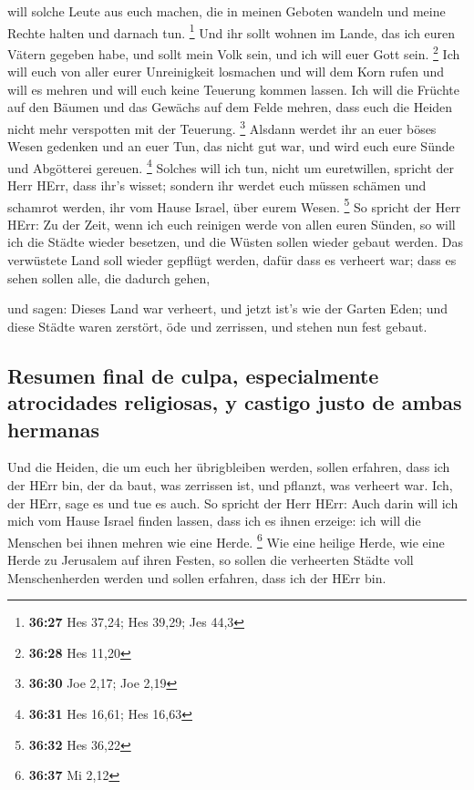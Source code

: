 will solche Leute aus euch machen, die in meinen Geboten wandeln und
meine Rechte halten und darnach tun. \footnote{\textbf{36:27} Hes 37,24;
  Hes 39,29; Jes 44,3}  Und ihr sollt wohnen im Lande,
das ich euren Vätern gegeben habe, und sollt mein Volk sein, und ich
will euer Gott sein. \footnote{\textbf{36:28} Hes 11,20} 
Ich will euch von aller eurer Unreinigkeit losmachen und will dem Korn
rufen und will es mehren und will euch keine Teuerung kommen lassen.
 Ich will die Früchte auf den Bäumen und das Gewächs auf
dem Felde mehren, dass euch die Heiden nicht mehr verspotten mit der
Teuerung. \footnote{\textbf{36:30} Joe 2,17; Joe 2,19} 
Alsdann werdet ihr an euer böses Wesen gedenken und an euer Tun, das
nicht gut war, und wird euch eure Sünde und Abgötterei gereuen.
\footnote{\textbf{36:31} Hes 16,61; Hes 16,63}  Solches
will ich tun, nicht um euretwillen, spricht der Herr HErr, dass ihr's
wisset; sondern ihr werdet euch müssen schämen und schamrot werden, ihr
vom Hause Israel, über eurem Wesen. \footnote{\textbf{36:32} Hes 36,22}
 So spricht der Herr HErr: Zu der Zeit, wenn ich euch
reinigen werde von allen euren Sünden, so will ich die Städte wieder
besetzen, und die Wüsten sollen wieder gebaut werden. 
Das verwüstete Land soll wieder gepflügt werden, dafür dass es verheert
war; dass es sehen sollen alle, die dadurch gehen,

 und sagen: Dieses Land war verheert, und jetzt ist's wie
der Garten Eden; und diese Städte waren zerstört, öde und zerrissen, und
stehen nun fest gebaut.

\hypertarget{resumen-final-de-culpa-especialmente-atrocidades-religiosas-y-castigo-justo-de-ambas-hermanas}{%
\subsection{Resumen final de culpa, especialmente atrocidades
religiosas, y castigo justo de ambas
hermanas}\label{resumen-final-de-culpa-especialmente-atrocidades-religiosas-y-castigo-justo-de-ambas-hermanas}}

 Und die Heiden, die um euch her übrigbleiben werden,
sollen erfahren, dass ich der HErr bin, der da baut, was zerrissen ist,
und pflanzt, was verheert war. Ich, der HErr, sage es und tue es auch.
 So spricht der Herr HErr: Auch darin will ich mich vom
Hause Israel finden lassen, dass ich es ihnen erzeige: ich will die
Menschen bei ihnen mehren wie eine Herde. \footnote{\textbf{36:37} Mi
  2,12}  Wie eine heilige Herde, wie eine Herde zu
Jerusalem auf ihren Festen, so sollen die verheerten Städte voll
Menschenherden werden und sollen erfahren, dass ich der HErr bin.

